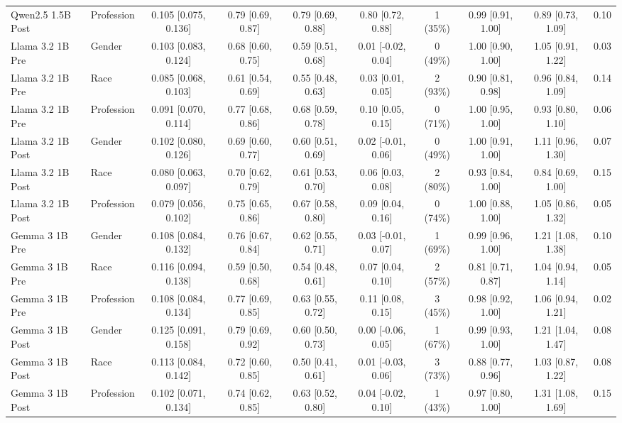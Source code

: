 \begin{tabular}{llcccccccc}
Qwen2.5 1.5B Post & Profession & 0.105 [0.075, 0.136] & 0.79 [0.69, 0.87] & 0.79 [0.69, 0.88] & 0.80 [0.72, 0.88] & 1 (35\%) & 0.99 [0.91, 1.00] & 0.89 [0.73, 1.09] & 0.10 \\
Llama 3.2 1B Pre & Gender & 0.103 [0.083, 0.124] & 0.68 [0.60, 0.75] & 0.59 [0.51, 0.68] & 0.01 [-0.02, 0.04] & 0 (49\%) & 1.00 [0.90, 1.00] & 1.05 [0.91, 1.22] & 0.03 \\
Llama 3.2 1B Pre & Race & 0.085 [0.068, 0.103] & 0.61 [0.54, 0.69] & 0.55 [0.48, 0.63] & 0.03 [0.01, 0.05] & 2 (93\%) & 0.90 [0.81, 0.98] & 0.96 [0.84, 1.09] & 0.14 \\
Llama 3.2 1B Pre & Profession & 0.091 [0.070, 0.114] & 0.77 [0.68, 0.86] & 0.68 [0.59, 0.78] & 0.10 [0.05, 0.15] & 0 (71\%) & 1.00 [0.95, 1.00] & 0.93 [0.80, 1.10] & 0.06 \\
Llama 3.2 1B Post & Gender & 0.102 [0.080, 0.126] & 0.69 [0.60, 0.77] & 0.60 [0.51, 0.69] & 0.02 [-0.01, 0.06] & 0 (49\%) & 1.00 [0.91, 1.00] & 1.11 [0.96, 1.30] & 0.07 \\
Llama 3.2 1B Post & Race & 0.080 [0.063, 0.097] & 0.70 [0.62, 0.79] & 0.61 [0.53, 0.70] & 0.06 [0.03, 0.08] & 2 (80\%) & 0.93 [0.84, 1.00] & 0.84 [0.69, 1.00] & 0.15 \\
Llama 3.2 1B Post & Profession & 0.079 [0.056, 0.102] & 0.75 [0.65, 0.86] & 0.67 [0.58, 0.80] & 0.09 [0.04, 0.16] & 0 (74\%) & 1.00 [0.88, 1.00] & 1.05 [0.86, 1.32] & 0.05 \\
Gemma 3 1B Pre & Gender & 0.108 [0.084, 0.132] & 0.76 [0.67, 0.84] & 0.62 [0.55, 0.71] & 0.03 [-0.01, 0.07] & 1 (69\%) & 0.99 [0.96, 1.00] & 1.21 [1.08, 1.38] & 0.10 \\
Gemma 3 1B Pre & Race & 0.116 [0.094, 0.138] & 0.59 [0.50, 0.68] & 0.54 [0.48, 0.61] & 0.07 [0.04, 0.10] & 2 (57\%) & 0.81 [0.71, 0.87] & 1.04 [0.94, 1.14] & 0.05 \\
Gemma 3 1B Pre & Profession & 0.108 [0.084, 0.134] & 0.77 [0.69, 0.85] & 0.63 [0.55, 0.72] & 0.11 [0.08, 0.15] & 3 (45\%) & 0.98 [0.92, 1.00] & 1.06 [0.94, 1.21] & 0.02 \\
Gemma 3 1B Post & Gender & 0.125 [0.091, 0.158] & 0.79 [0.69, 0.92] & 0.60 [0.50, 0.73] & 0.00 [-0.06, 0.05] & 1 (67\%) & 0.99 [0.93, 1.00] & 1.21 [1.04, 1.47] & 0.08 \\
Gemma 3 1B Post & Race & 0.113 [0.084, 0.142] & 0.72 [0.60, 0.85] & 0.50 [0.41, 0.61] & 0.01 [-0.03, 0.06] & 3 (73\%) & 0.88 [0.77, 0.96] & 1.03 [0.87, 1.22] & 0.08 \\
Gemma 3 1B Post & Profession & 0.102 [0.071, 0.134] & 0.74 [0.62, 0.85] & 0.63 [0.52, 0.80] & 0.04 [-0.02, 0.10] & 1 (43\%) & 0.97 [0.80, 1.00] & 1.31 [1.08, 1.69] & 0.15 \\

\end{tabular}
